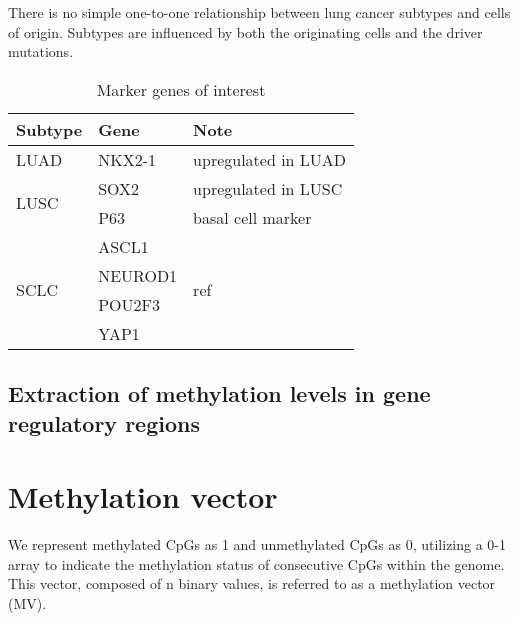 \documentclass[12pt,letterpaper]{article}
\begin{document}
There is no simple one-to-one relationship between lung cancer subtypes and cells of origin. Subtypes are
influenced by both the originating cells and the driver mutations\cite{ferone_cells_2020}.

\begin{table}[htbp]
    \begin{center}
        \caption{ Marker genes of interest}
        \begin{tabular}{|l|l|l|}
            \hline
            \textbf{Subtype}      & \textbf{Gene} & \textbf{Note}                              \\
            \hline
            LUAD                  & NKX2-1        & upregulated in LUAD                        \\
            \hline
            \multirow{2}{*}{LUSC} & SOX2          & upregulated in LUSC                        \\
            \cline{2-3}           & P63           & basal cell marker                          \\
            \hline
            \multirow{4}{*}{SCLC} & ASCL1         & \multirow{4}{*}{ref\cite{baine_sclc_2020}} \\
            \cline{2-2}           & NEUROD1       &                                            \\
            \cline{2-2}           & POU2F3        &                                            \\
            \cline{2-2}           & YAP1          &                                            \\
            \hline
        \end{tabular}
    \end{center}
    \label{tab:gene-marker}
\end{table}
\subsection{Extraction of methylation levels in gene regulatory regions}\label{sec:gene-methylation}

\section{Methylation vector}\label{sec:vector}

We represent methylated CpGs as 1 and unmethylated CpGs as 0, utilizing a 
0-1 array to indicate the methylation status of consecutive CpGs within the 
genome. This vector, composed of n binary values, is referred to as a 
methylation vector (MV).
\end{document}
